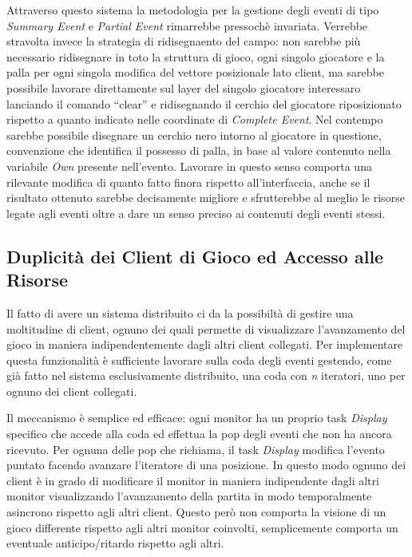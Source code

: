 \documentclass[aps,letterpaper,10pt]{article}
\begin{document}
Attraverso questo sistema la metodologia per la gestione degli eventi di tipo \emph{Summary Event} e \emph{Partial Event} rimarrebbe pressoch\`e invariata. Verrebbe stravolta invece la strategia di ridisegnaento del campo: non sarebbe più necessario ridisegnare in toto la struttura di gioco, ogni singolo giocatore e la palla per ogni singola modifica del vettore posizionale lato client, ma sarebbe possibile lavorare direttamente sul layer del singolo giocatore interessaro lanciando il comando ``clear'' e ridisegnando il cerchio del giocatore riposizionato rispetto a quanto indicato nelle coordinate di \emph{Complete Event}. Nel contempo sarebbe possibile disegnare un cerchio nero intorno al giocatore in questione, convenzione che identifica il possesso di palla, in base al valore contenuto nella variabile \emph{Own} presente nell'evento. Lavorare in questo senso comporta una rilevante modifica di quanto fatto finora rispetto all'interfaccia, anche se il risultato ottenuto sarebbe decisamente migliore e sfrutterebbe al meglio le risorse legate agli eventi oltre a dare un senso preciso ai contenuti degli eventi stessi.



\subsection{Duplicit\`a dei Client di Gioco ed Accesso alle Risorse} %
\label{sub:duplicit`a_dei_client_di_gioco_ed_accesso_alle_risorse}

Il fatto di avere un sistema distribuito ci da la possibilt\`a di gestire una moltitudine di client, ognuno dei quali permette di visualizzare l'avanzamento del gioco in maniera indipendentemente dagli altri client collegati. Per implementare questa funzionalit\`a \`e sufficiente lavorare sulla coda degli eventi gestendo, come gi\`a fatto nel sistema esclusivamente distribuito, una coda con \emph{n} iteratori, uno per ognuno dei client collegati. \vspace{3mm}

Il meccanismo \`e semplice ed efficace: ogni monitor ha un proprio task \emph{Display} specifico che accede alla coda ed effettua la pop degli eventi che non ha ancora ricevuto. Per ognuna delle pop che richiama, il task \emph{Display} modifica l'evento puntato facendo avanzare l'iteratore di una posizione. In questo modo ognuno dei client \`e in grado di modificare il monitor in maniera indipendente dagli altri monitor visualizzando l'avanzamento della partita in modo temporalmente asincrono rispetto agli altri client. Questo per\`o non comporta la visione di un gioco differente rispetto agli altri monitor coinvolti, semplicemente comporta un eventuale anticipo/ritardo rispetto agli altri. \vspace{3mm}
\end{document}
